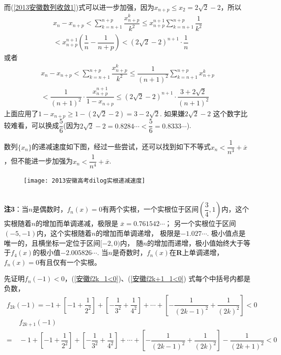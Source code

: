 \begin{enumerate}[label={【\textbf{例\thechapter.\arabic*}】},
 leftmargin=\inteval{\myenumleftmargin}pt,
 itemsep=\inteval{\myenumitempsep}pt,
 itemindent=\inteval{\myenumitemindent}pt]
而(\ref{2013安徽数列收敛1})式可以进一步加强，因为$ x_{n+p}\leq x_2=2\sqrt{2}-2 $，所以
\begin{gather*}
    x_{n}-x_{n+p}<\sum_{k=n+1}^{n+p}\dfrac{x_{n+p}^k}{k^2}\leq 
    x_{n+p}^{n+1}\sum_{k=n+1}^{n+p}\dfrac{1}{k^2}  \\ <
    x_{n+p}^{n+1}\left(\dfrac{1}{n}-\dfrac{1}{n+p}\right)
    <\left(2\sqrt{2}-2\right)^{n+1}\cdot \dfrac{1}{n}
\end{gather*}
或者
\begin{gather*}
    x_{n}-x_{n+p}<\sum_{k=n+1}^{n+p}\dfrac{x_{n+p}^k}{k^2}\leq 
    \dfrac{1}{(n+1)^2}\sum_{k=n+1}^{n+p} x_{n+p}^k \\
    <\dfrac{1}{(n+1)^2}\cdot \dfrac{x_{n+p}^{n+1}}{1-x_{n+p}}       
    \leq \left(2\sqrt{2}-2\right)^{n+1}\cdot \dfrac{3+2\sqrt{2}}{(n+1)^2}
\end{gather*}
上面应用了$ 1-x_{n+p}\geq 1-(2\sqrt{2}-2)=3-2\sqrt{2} $. 如果嫌$ 2\sqrt{2}-2 $
这个数字比较难看，可以换成$ \dfrac{5}{6} $(因为$ 2\sqrt{2}-2=0.8284\cdots <
\dfrac{5}{6}=0.8333\cdots $).

数列$ \{x_n\} $的递减速度如下图，经过一些尝试，还可以找到如下不等式$ x_n<\dfrac{1}{n^3}+\overline{x} $，但不能进一步加强为$ x_n<\dfrac{1}{n^4}+\overline{x} $.
\begin{figure}[h]
    \centering
    \texttt{[image: 2013安徽高考dilog实根递减速度]}
\end{figure} \\
\textbf{注3}：当$ n $是偶数时，$ f_n(x)=0 $有两个实根，一个实根位于区间$ \left(\dfrac{3}{4},1\right) $内，这个实根随着$ n $的增加而单调递减，极限是
$ \overline{x}=0.761542\cdots $；
另一个实根位于区间$ (-5,-1) $内，这个实根随着$ n $的增加而单调递增，
极限是$ -1.027\cdots $. 极小值点是唯一的，且横坐标一定位于区间$ [-2,0) $内，
随$ n $的增加而递增，极小值始终大于等于$ f_4(x) $的极小值$ -2.005826\cdots $. 
当$ n $是奇数时，$ f_n(x) $在\textbf{R}上单调递增，$ f_n(x)=0 $有且仅有一个实根。

先证明$ f_n(-1)<0 $，(\ref{安徽f2k_1<0})、(\ref{安徽f2k+1_1<0})
式每个中括号内都是负数，
\begin{align}
  f_{2k}(-1) =-1+\left[-1+\dfrac{1}{2^2}\right]+\left[-\dfrac{1}{3^2}
    +\dfrac{1}{4^2}\right] +\cdots+\left[-\dfrac{1}{(2k-1)^2}
    +\dfrac{1}{(2k)^2}\right]<0 \label{安徽f2k_1<0}  
\end{align}
\begin{align}
    &\ f_{2k+1}(-1) \nonumber \\
   =&\ -1+\left[-1+\dfrac{1}{2^2}\right]+\left[-\dfrac{1}{3^2}
    +\dfrac{1}{4^2}\right]+\cdots+\left[-\dfrac{1}{(2k-1)^2}
    +\dfrac{1}{(2k)^2}\right]-\dfrac{1}{(2k+1)^2}<0 
    \label{安徽f2k+1_1<0} 
\end{align}


\end{enumerate}
